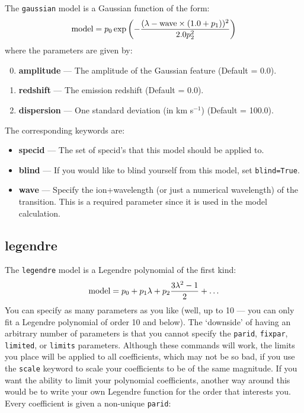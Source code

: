 The \texttt{gaussian} model is a Gaussian function of the form:
\begin{equation}
{\rm model}=p_0 \exp\left(-\frac{(\lambda-{\rm wave}\times(1.0+p_1))^2}{2.0p_{2}^{2}}\right)
\end{equation}
where the parameters are given by:
\begin{enumerate}
\setcounter{enumi}{-1}
\item \textbf{amplitude} --- The amplitude of the Gaussian feature (Default = 0.0).
\item \textbf{redshift} --- The emission redshift (Default = 0.0).
\item \textbf{dispersion} --- One standard deviation (in km s$^{-1}$) (Default = 100.0).
\end{enumerate}
The corresponding keywords are:
\begin{itemize}
\item \textbf{specid} --- The set of specid's that this model should be applied to.
\item \textbf{blind} --- If you would like to blind yourself from this model, set \texttt{blind=True}.
\item \textbf{wave} --- Specify the ion+wavelength (or just a numerical wavelength) of the transition. This is a required parameter since it is used in the model calculation.
\end{itemize}


\subsection{legendre}

The \texttt{legendre} model is a Legendre polynomial of the first kind:
\begin{equation}
{\rm model}=p_0 + p_1\lambda + p_2\frac{3\lambda^2 - 1}{2} + \ldots
\end{equation}
You can specify as many parameters as you like (well, up to 10 --- you can
only fit a Legendre polynomial of order 10 and below). The `downside' of
having an arbitrary number of parameters is that you cannot specify the
\texttt{parid}, \texttt{fixpar}, \texttt{limited}, or \texttt{limits} parameters. Although
these commands will work, the limits you place will be applied to all coefficients,
which may not be so bad, if you use the \texttt{scale} keyword to scale your
coefficients to be of the same magnitude. If you want the ability to limit your
polynomial coefficients, another way around this would be to write your own
Legendre function for the order that interests you. Every coefficient is given
a non-unique \texttt{parid}:

